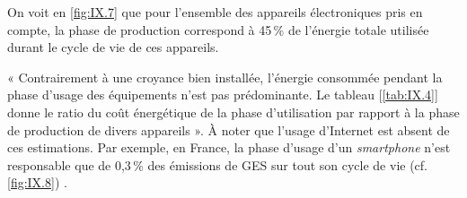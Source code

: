 
\vspace{6pt}

On voit en \cref{fig:IX.7} que pour l'ensemble des appareils électroniques pris en compte, la phase de production correspond à 45\,\% de l'énergie totale utilisée durant le cycle de vie de ces appareils.

« Contrairement à une croyance bien installée, l’énergie consommée pendant la phase d’usage des équipements n’est pas prédominante. Le tableau [\ref{tab:IX.4}] donne le ratio du coût énergétique de la phase d’utilisation par rapport à la phase de production de divers appareils ». À noter que l'usage d'Internet est absent de ces estimations. Par exemple, en France, la phase d'usage d'un \textit{smartphone} n'est responsable que de 0,3\,\% des émissions de GES sur tout son cycle de vie (cf. \cref{fig:IX.8}) \parencite{Marquet-et-al:2019}. 

